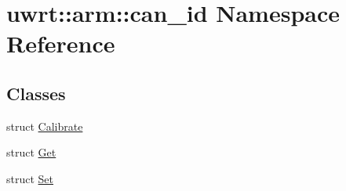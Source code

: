 \hypertarget{namespaceuwrt_1_1arm_1_1can__id}{}\section{uwrt\+:\+:arm\+:\+:can\+\_\+id Namespace Reference}
\label{namespaceuwrt_1_1arm_1_1can__id}
\subsection*{Classes}
\begin{DoxyCompactItemize}
\item 
struct \hyperlink{structuwrt_1_1arm_1_1can__id_1_1_calibrate}{Calibrate}
\item 
struct \hyperlink{structuwrt_1_1arm_1_1can__id_1_1_get}{Get}
\item 
struct \hyperlink{structuwrt_1_1arm_1_1can__id_1_1_set}{Set}
\end{DoxyCompactItemize}
